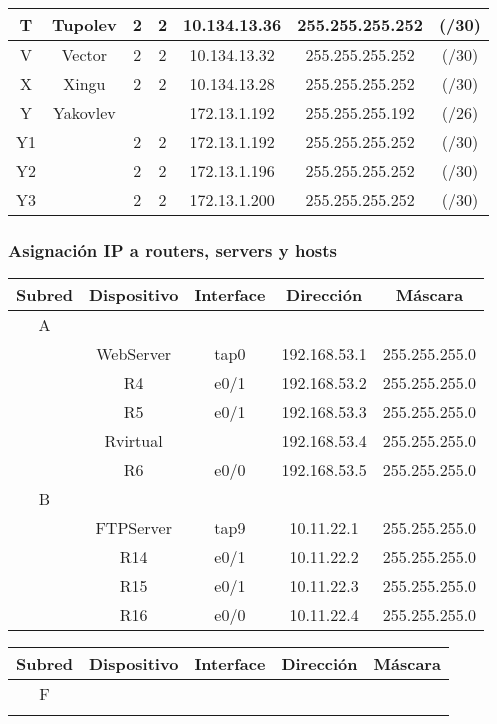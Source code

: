 \documentclass[12pt,a4paper,spanish]{article}
\begin{document}
\begin{tabular}{|c|c|c|c|c|c c|}
	\hline
	T & Tupolev 	& 2 & 2 & 10.134.13.36 	& 255.255.255.252 & (/30) \\
	\hline
	V & Vector 	& 2 & 2 & 10.134.13.32 	& 255.255.255.252 & (/30) \\
	\hline
	X & Xingu 	& 2 & 2 & 10.134.13.28 	& 255.255.255.252 & (/30) \\
	\hline
	Y & Yakovlev & & 	& 172.13.1.192 	& 255.255.255.192 & (/26) \\
	\hline
	Y1 & 		& 2 & 2 & 172.13.1.192 	& 255.255.255.252 & (/30) \\
	\hline
	Y2 & 		& 2 & 2 & 172.13.1.196 	& 255.255.255.252 & (/30) \\
	\hline
	Y3 & 		& 2 & 2 & 172.13.1.200 	& 255.255.255.252 & (/30) \\
	\hline
\end{tabular}


\newpage
\subsubsection{Asignación IP a routers, servers y hosts}

\begin{tabular}{|c|c|c|c|c|}
	\hline
	Subred & Dispositivo & Interface & Dirección & Máscara \\
	\hline
	\hline
	A & & & & \\
	\hline
	 & WebServer 	& tap0 	& 192.168.53.1 	& 255.255.255.0 \\
	\hline
	 & R4 			& e0/1 	& 192.168.53.2 	& 255.255.255.0 \\
	\hline
	 & R5 			& e0/1 	& 192.168.53.3 	& 255.255.255.0 \\
	\hline
	 & Rvirtual 		& 		& 192.168.53.4 	& 255.255.255.0 \\
	\hline
	 & R6 			& e0/0 	& 192.168.53.5 	& 255.255.255.0 \\
	\hline
	\hline
	B & & & & \\
	\hline
	 & FTPServer 	& tap9 	& 10.11.22.1 	& 255.255.255.0 \\
	\hline
	 & R14 			& e0/1 	& 10.11.22.2 	& 255.255.255.0 \\
	\hline
	 & R15 			& e0/1  & 10.11.22.3 	& 255.255.255.0 \\
	\hline
	 & R16 			& e0/0 	& 10.11.22.4 	& 255.255.255.0 \\
	\hline
\end{tabular}



\begin{tabular}{|c|c|c|c|c|}
	\hline
	Subred & Dispositivo & Interface & Dirección & Máscara \\
	\hline
	\hline
	F & & & & \\
	\hline
	  &  &  &  &  \\
	\hline
\end{tabular}
\end{document}
